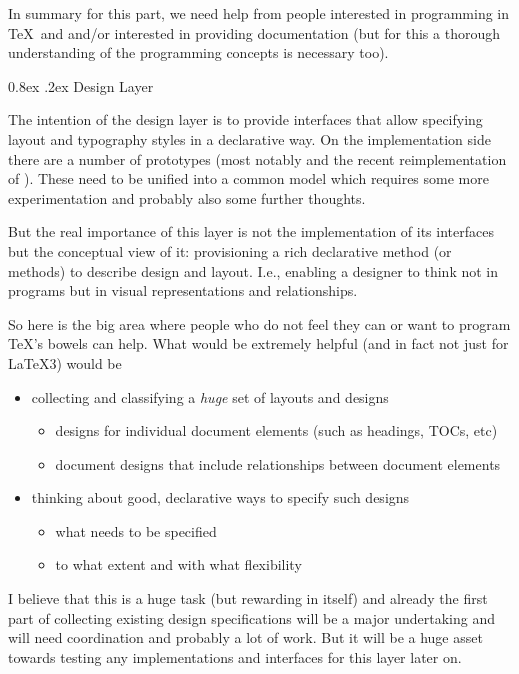 \documentclass{ltnews}
\makeatletter
\renewcommand{\@subheadingfont}{%
   \sffamily\slshape
   \let\LaTeX\cmssLaTeX\let\TeX\cmssTeX
}
\renewcommand{\subsection}{%
   \@startsection
      {subsection}{2}{\z@}{-1.3ex \@plus -1ex \@minus -.2ex}%
      {0.8ex \@plus.2ex}{\@subheadingfont}%
}
\makeatother
\begin{document}
In summary for this part, we need help from people interested in programming in \TeX\ and  and/or interested in providing documentation (but for this a thorough understanding of the programming concepts is necessary too).

\subsection{Design Layer}

The intention of the design layer is to provide interfaces that allow specifying layout and typography styles in a declarative way. On the implementation side there are a number of prototypes (most notably  and the recent reimplementation of ).
These need to be unified into a common model which requires some more experimentation and probably also some further thoughts.

But the real importance of this layer is not the implementation of its interfaces but the conceptual view of it: provisioning a rich declarative method (or methods) to describe design and layout. I.e., enabling a designer to think not in programs but in visual representations and relationships.

So here is the big area where people who do not feel they can or want to program \TeX's bowels can help. What would be extremely helpful (and in fact not just for \LaTeX3) would be
\begin{itemize}
\item collecting and classifying a \emph{huge} set of layouts and designs
\begin{itemize}[nosep]
\item designs for individual document elements (such as headings, TOCs, etc)
\item document designs that include relationships between document elements
\end{itemize}
\item thinking about good, declarative ways to specify such designs
\begin{itemize}[nosep]
\item what needs to be specified
\item to what extent and with what flexibility
\end{itemize}
\end{itemize}
I believe that this is a huge task (but rewarding in itself) and already the first part of collecting existing design specifications will be a major undertaking and will need coordination and probably a lot of work. But it will be a huge asset towards testing any implementations and interfaces for this layer later on.
\end{document}
